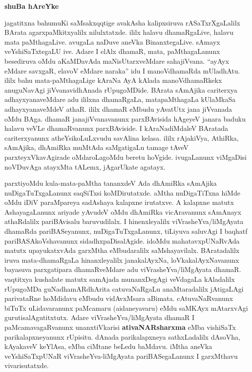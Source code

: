 \begin{center}
{\Huge\bfseries shuBa hAreYke}
\end{center}

\thispagestyle{empty}

\bigskip

jagatitxna bahumuKi saMsakxqqtige avakAsha kalipxsiruva rASaTxrXgaLalilx BArata agarxpaMkitxyalilx nilulxtatxde. ililx halavu dhamaRgaLive, halavu mata paMthagaLive. avugaLa naDuve aneVka BinanxtegaLive. sAmayx veYshiSaTxtegaLU ive. Adare I elAlx dhamaR, mata, paMthagaLanunx besediruva oMdu aKaMDavAda maNisUtarxveMdare sahajiVvana. ``ayAyx eMdare savxgaR, elavoV eMdare naraka'' idu I manoV\-dhamaRda mUladhAtu. ililx bahu mata-paMthagaLige kAraNa AyA kAlada manoVdhamaRkekx anuguNavAgi jiVvana\-vidhAnada rUpugoMDide. BArata sAmAjika cariterxya adhayxyanaveMdare adu ililxna dhamaRgaLa, matapaMthagaLa kUlaMkaSa \hbox{adhayxyanaveMdeV} athaR. ililx dhamaR eMbudu yAvatUtx jana jiVvanada oMdu BAga. dhamaR janajiVvanavanunx parxBAvisida hAgeyeV janara baduku halavu veVLe dhamaRvanunx parxBAviside. I kAraNadiMdaleV BAratada cariterxyanunx atheYsikoLuLxvudu savAlina kelasa. ililx \hbox{rAjakiVya}, AthiRka, sAmAjika, dhAmiRka muMtAda saMgatigaLu tamage tAveV parxteyxVkavAgirade oMdaroLagoMdu beretu hoVgide. ivu\-gaLanunx viMgaDisi noVDuvAga atayxMta tALemx, jAgarUkate agatayx.

\medskip

parxtiyoMdu kula-mata-paMtha tananxdeV Ada dhAmiRka sAmAjika nuDigaTuTxgaLanunx saqSiTxsi koMDirutatxde. aMtha nuDigaTiTxna hiMde oMdu iDiV paraMpareya sadAshaya kalapxne irutatxve. A kalapxne matutx AshayagaLanunx ariyade yAvudeV oMdu dhAmiRka vicAravanunx sAmAnayx athaRdalilx pariBAvisalu baruvudilalx. I hinenxleyalilx viVrasheYva/liMgAyata dhamaRda pariBASe\-yanunx, nuDigaTuTxgaLanunx, tiLiyuva saluvAgi I baqhatf pariBASAkoVshavanunx sidadhxpaDisalAgide. idoMdu mahatavxpUNaRvAda matutx upayukatxvAda garxMtha eMbudaralilx saMshayavilalx. BAratadalilx iruva mata-dhamaRgaLa hinanxleyalilx janakalAyxNa, loVkakalAyxNa\-vanunx bayasuva parxgatipara dhamaRveMdare adu viVrasheYva/liMgAyata dhamaR. vaqtitxya kushalate matutx samAjada munanxDegAgi veVdagaLa kAladalilx rUpugoMDa guNadhamARdhArita catuvaNaRgaLu anaMtaradalilx jAtigaLAgi parivataRne hoMdidavu eMbudu \hbox{vidAvxMsara} aBimata. cAtuvaNaRvanunx biTuTx uLidavaranunx paMcamaru (aidaneyavaru) eMdu saMKAyx mAtarxvAgi gurutisalAgutitxtutx. Adare viVrasheYva/liMgAyata dhamaR I paMcamavagaRvanunx unanxtiVkarisi \textbf{ativaNARsharxma} eMba vishiSaTx parikalapxneyanunx rUpisitu. dAnada parikalapxneya sathxLadalilx dAsoVha, kAyakaveV keYlAsa, eMba ciMtane beLedu baMdavu. iMtha aneVka veYshiSaTxpUNaR viVrasheYva-liMgAyata pariBASegaLanunx I garxMthavu vivarisutatxde.

